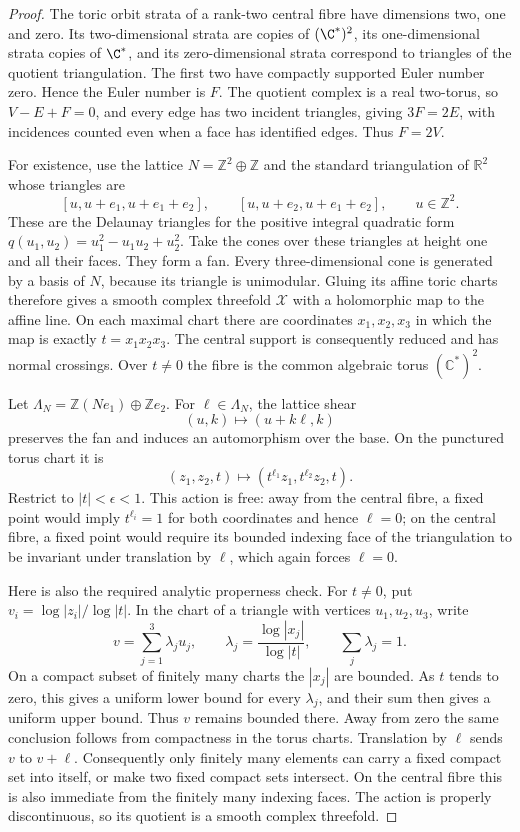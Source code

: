 \begin{proof}
The toric orbit strata of a rank-two central fibre have dimensions two, one and zero. Its two-dimensional strata are copies of $(\C^*)^2$, its one-dimensional strata copies of $\C^*$, and its zero-dimensional strata correspond to triangles of the quotient triangulation. The first two have compactly supported Euler number zero. Hence the Euler number is $F$. The quotient complex is a real two-torus, so $V-E+F=0$, and every edge has two incident triangles, giving $3F=2E$, with incidences counted even when a face has identified edges. Thus $F=2V$.

For existence, use the lattice $N=\mathbb Z^2\oplus\mathbb Z$
and the standard triangulation of $\mathbb R^2$ whose triangles are
\[
 [u,u+e_1,u+e_1+e_2],\qquad
 [u,u+e_2,u+e_1+e_2],\qquad u\in\mathbb Z^2.
\]
These are the Delaunay triangles for the positive integral quadratic
form $q(u_1,u_2)=u_1^2-u_1u_2+u_2^2$.
Take the cones over these triangles at height one and all their
faces. They form a fan. Every three-dimensional cone is generated
by a basis of $N$, because its triangle is unimodular. Gluing its
affine toric charts therefore gives a smooth complex threefold
$\mathcal X$ with a holomorphic map to the affine line. On each
maximal chart there are coordinates $x_1,x_2,x_3$ in which the map
is exactly $t=x_1x_2x_3$. The central support is consequently
reduced and has normal crossings. Over $t\ne0$ the fibre is the
common algebraic torus $(\mathbb C^*)^2$.

Let $\Lambda_N=\mathbb Z(Ne_1)\oplus\mathbb Z e_2$.
For $\ell\in\Lambda_N$, the lattice shear
\[
 (u,k)\longmapsto(u+k\ell,k)
\]
preserves the fan and induces an automorphism over the base.
On the punctured torus chart it is
\[
 (z_1,z_2,t)\longmapsto
 (t^{\ell_1}z_1,t^{\ell_2}z_2,t).
\]
Restrict to $|t|<\epsilon<1$. This action is free: away from the
central fibre, a fixed point would imply $t^{\ell_i}=1$ for both
coordinates and hence $\ell=0$; on the central fibre, a fixed
point would require its bounded indexing face of the triangulation
to be invariant under translation by $\ell$, which again forces
$\ell=0$.

Here is also the required analytic properness check. For $t\ne0$,
put $v_i=\log|z_i|/\log|t|$. In the chart of a triangle with
vertices $u_1,u_2,u_3$, write
\[
 v=\sum_{j=1}^3\lambda_j u_j,\qquad
 \lambda_j=\frac{\log|x_j|}{\log|t|},\qquad
 \sum_j\lambda_j=1.
\]
On a compact subset of finitely many charts the $|x_j|$ are
bounded. As $t$ tends to zero, this gives a uniform lower bound
for every $\lambda_j$, and their sum then gives a uniform upper
bound. Thus $v$ remains bounded there. Away from zero the same
conclusion follows from compactness in the torus charts.
Translation by $\ell$ sends $v$ to $v+\ell$. Consequently only
finitely many elements can carry a fixed compact set into itself,
or make two fixed compact sets intersect. On the central fibre
this is also immediate from the finitely many indexing faces.
The action is properly discontinuous, so its quotient is a smooth
complex threefold.


\end{proof}
